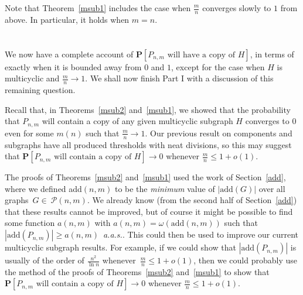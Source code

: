 \documentclass{article}
\newtheorem{Proof of Theorem}{Proof of Theorem}
\begin{document}
\phantom{p}

\phantom{p}

















Note that Theorem~\ref{msub1} includes the case when $\frac{m}{n}$ converges slowly to $1$ from above.
In particular,
it holds when $m=n$. \\
\\
\\













We now have a complete account of
$\mathbf{P}[P_{n,m} \textrm{ will have a copy of } H]$,
in terms of exactly when it is bounded away from $0$ and $1$,
except for the case when $H$ is multicyclic and $\frac{m}{n} \to 1$.
We shall now finish Part I with a discussion of this remaining question.

Recall that, in Theorems~\ref{msub2} and~\ref{msub1},
we showed that the probability that $P_{n,m}$ will contain a copy of any given multicyclic subgraph $H$
converges to $0$ even for some $m(n)$ such that $\frac{m}{n} \to 1$.
Our previous result on components and subgraphs have all produced thresholds with neat divisions,
so this may suggest that
$\mathbf{P}[P_{n,m} \textrm{ will contain a copy of }H] \to 0$
whenever $\frac{m}{n} \leq 1+o(1)$.

The proofs of Theorems~\ref{msub2} and~\ref{msub1}
used the work of Section~\ref{add},
where we defined add$(n,m)$ to be the \textit{minimum} value of $|\textrm{add}(G)|$
over all graphs~$G \!\in~\!\!\mathcal{P}(n,m)$.
We already know 
(from the second half of Section~\ref{add})
that these results cannot be improved,
but of course it might be possible to find some function $a(n,m)$ with
$a(n,m) = \omega(\textrm{add}(n,m))$
such that $|\textrm{add}(P_{n,m})| \geq a(n,m)$~\textit{a.a.s.}.
This could then be used to improve our current multicyclic subgraph results.
For example, if we could show that $|\textrm{add}(P_{n,m})|$
is usually of the order of $\frac{n^{2}}{\ln n}$ whenever~$\frac{m}{n} \leq 1+o(1)$,
then we could probably use the method of the proofs of Theorems~\ref{msub2} and~\ref{msub1}
to show that
$\mathbf{P}[P_{n,m} \textrm{ will contain a copy of }H] \to 0$
whenever $\frac{m}{n} \leq 1+o(1)$. 
\end{document}
